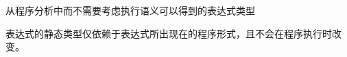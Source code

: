 从程序分析中而不需要考虑执行语义可以得到的表达式类型

\begin{note}[\noindent]
表达式的静态类型仅依赖于表达式所出现在的程序形式，且不会在程序执行时改变。
\end{note}
